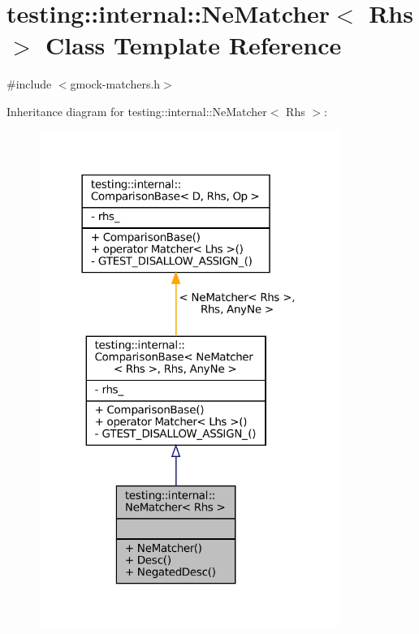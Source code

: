 \hypertarget{classtesting_1_1internal_1_1NeMatcher}{}\section{testing\+:\+:internal\+:\+:Ne\+Matcher$<$ Rhs $>$ Class Template Reference}
\label{classtesting_1_1internal_1_1NeMatcher}


{\ttfamily \#include $<$gmock-\/matchers.\+h$>$}



Inheritance diagram for testing\+:\+:internal\+:\+:Ne\+Matcher$<$ Rhs $>$\+:
\nopagebreak
\begin{figure}[H]
\begin{center}
\leavevmode
\includegraphics[width=278pt]{classtesting_1_1internal_1_1NeMatcher__inherit__graph}
\end{center}
\end{figure}


